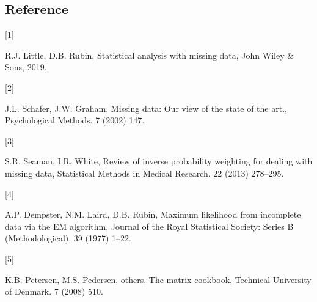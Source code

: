 \documentclass[
  twocolumn]{article}
\newlength{\cslhangindent}
\newlength{\csllabelwidth}
\newlength{\cslentryspacingunit} %
\newenvironment{CSLReferences}[2] %
 {%
  \setlength{\parindent}{0pt}
  \ifodd #1
  \let\oldpar\par
  \def\par{\hangindent=\cslhangindent\oldpar}
  \fi
  \setlength{\parskip}{#2\cslentryspacingunit}
 }%
 {}
\newcommand{\CSLLeftMargin}[1]{\parbox[t]{\csllabelwidth}{#1}}
\newcommand{\CSLRightInline}[1]{\parbox[t]{\linewidth - \csllabelwidth}{#1}\break}
\begin{document}
\hypertarget{reference}{%
\subsection*{Reference}\label{reference}}

\hypertarget{refs}{}
\begin{CSLReferences}{0}{0}
\leavevmode{}%
\CSLLeftMargin{{[}1{]} }%
\CSLRightInline{R.J. Little, D.B. Rubin, Statistical analysis with
missing data, John Wiley \& Sons, 2019.}

\leavevmode{}%
\CSLLeftMargin{{[}2{]} }%
\CSLRightInline{J.L. Schafer, J.W. Graham, Missing data: Our view of the
state of the art., Psychological Methods. 7 (2002) 147.}

\leavevmode{}%
\CSLLeftMargin{{[}3{]} }%
\CSLRightInline{S.R. Seaman, I.R. White, Review of inverse probability
weighting for dealing with missing data, Statistical Methods in Medical
Research. 22 (2013) 278--295.}

\leavevmode{}%
\CSLLeftMargin{{[}4{]} }%
\CSLRightInline{A.P. Dempster, N.M. Laird, D.B. Rubin, Maximum
likelihood from incomplete data via the EM algorithm, Journal of the
Royal Statistical Society: Series B (Methodological). 39 (1977) 1--22.}

\leavevmode{}%
\CSLLeftMargin{{[}5{]} }%
\CSLRightInline{K.B. Petersen, M.S. Pedersen, others, The matrix
cookbook, Technical University of Denmark. 7 (2008) 510.}

\end{CSLReferences}
\end{document}
